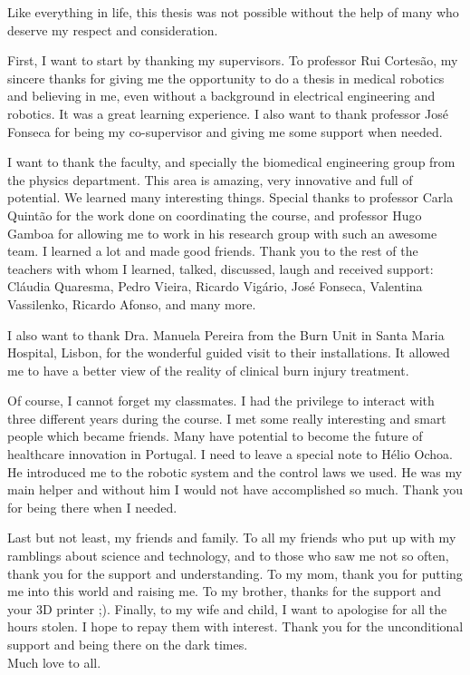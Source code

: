 \acknowledgements

Like everything in life, this thesis was not possible without the help of many who deserve my respect and consideration.

First, I want to start by thanking my supervisors. To professor Rui Cortesão, my sincere thanks for giving me the opportunity to do a thesis in medical robotics and believing in me, even without a background in electrical engineering and robotics. It was a great learning experience. I also want to thank professor José Fonseca for being my co-supervisor and giving me some support when needed.

I want to thank the faculty, and specially the biomedical engineering group from the physics department. This area is amazing, very innovative and full of potential. We learned many interesting things. Special thanks to professor Carla Quintão for the work done on coordinating the course, and professor Hugo Gamboa for allowing me to work in his research group with such an awesome team. I learned a lot and made good friends. Thank you to the rest of the teachers with whom I learned, talked, discussed, laugh and received support: Cláudia Quaresma, Pedro Vieira, Ricardo Vigário, José Fonseca, Valentina Vassilenko, Ricardo Afonso, and many more.

I also want to thank Dra. Manuela Pereira from the Burn Unit in Santa Maria Hospital, Lisbon, for the wonderful guided visit to their installations. It allowed me to have a better view of the reality of clinical burn injury treatment.

Of course, I cannot forget my classmates. I had the privilege to interact with three different years during the course. I met some really interesting and smart people which became friends. Many have potential to become the future of healthcare innovation in Portugal. I need to leave a special note to Hélio Ochoa. He introduced me to the robotic system and the control laws we used. He was my main helper and without him I would not have accomplished so much. Thank you for being there when I needed.

Last but not least, my friends and family. To all my friends who put up with my ramblings about science and technology, and to those who saw me not so often, thank you for the support and understanding. To my mom, thank you for putting me into this world and raising me. To my brother, thanks for the support and your 3D printer ;). Finally, to my wife and child, I want to apologise for all the hours stolen. I hope to repay them with interest. Thank you for the unconditional support and being there on the dark times.\\

Much love to all.

